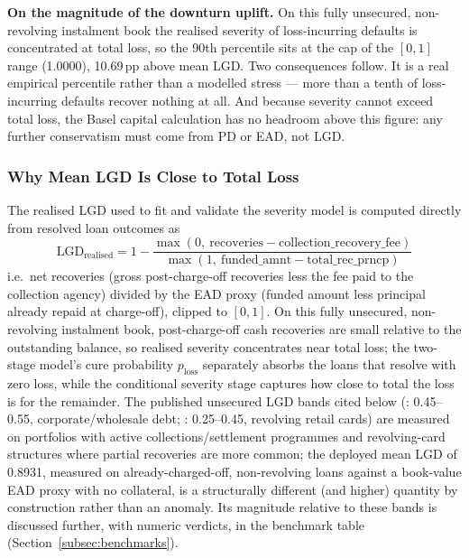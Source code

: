 \documentclass[11pt,a4paper]{article}
\begin{document}
\noindent\textbf{On the magnitude of the downturn uplift.} On this fully unsecured, non-revolving instalment book the realised severity of loss-incurring defaults is concentrated at total loss, so the 90th percentile sits at the cap of the $[0,1]$ range (1.0000), 10.69\,pp above mean LGD. Two consequences follow. It is a real empirical percentile rather than a modelled stress --- more than a tenth of loss-incurring defaults recover nothing at all. And because severity cannot exceed total loss, the Basel capital calculation has no headroom above this figure: any further conservatism must come from PD or EAD, not LGD.

\subsubsection*{Why Mean LGD Is Close to Total Loss}
The realised LGD used to fit and validate the severity model is computed directly from resolved loan outcomes as
\begin{equation}
\text{LGD}_{\text{realised}} = 1 - \frac{\max(0,\ \text{recoveries} - \text{collection\_recovery\_fee})}{\max(1,\ \text{funded\_amnt} - \text{total\_rec\_prncp})}
\end{equation}
i.e.\ net recoveries (gross post-charge-off recoveries less the fee paid to the collection agency) divided by the EAD proxy (funded amount less principal already repaid at charge-off), clipped to $[0,1]$. On this fully unsecured, non-revolving instalment book, post-charge-off cash recoveries are small relative to the outstanding balance, so realised severity concentrates near total loss; the two-stage model's cure probability $p_{\text{loss}}$ separately absorbs the loans that resolve with zero loss, while the conditional severity stage captures how close to total the loss is for the remainder. The published unsecured LGD bands cited below (\textcite{schuermann2004}: 0.45--0.55, corporate/wholesale debt; \textcite{bellotti2012}: 0.25--0.45, revolving retail cards) are measured on portfolios with active collections/settlement programmes and revolving-card structures where partial recoveries are more common; the deployed mean LGD of 0.8931, measured on already-charged-off, non-revolving loans against a book-value EAD proxy with no collateral, is a structurally different (and higher) quantity by construction rather than an anomaly. Its magnitude relative to these bands is discussed further, with numeric verdicts, in the benchmark table (Section~\ref{subsec:benchmarks}).
\end{document}
